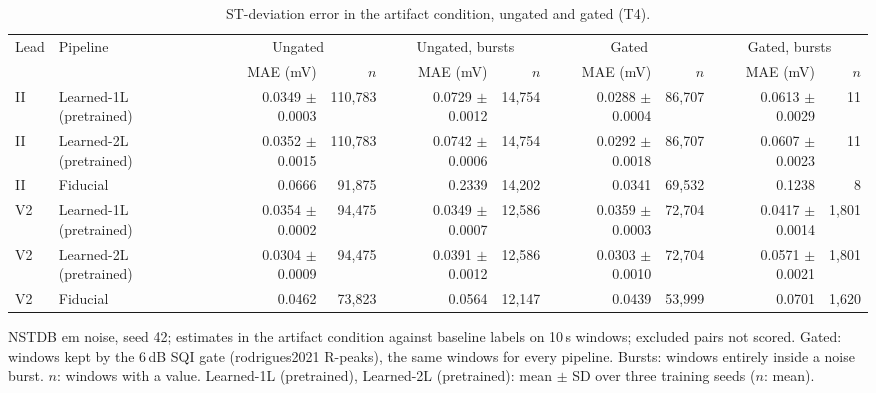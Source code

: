 \begin{table}[htbp]
\centering
\small
\caption{ST-deviation error in the artifact condition, ungated and gated (T4).}
\label{tab:t4_noise}
\begin{tabular}{llrrrrrrrr}
\toprule
Lead & Pipeline & \multicolumn{2}{c}{Ungated} & \multicolumn{2}{c}{Ungated, bursts} & \multicolumn{2}{c}{Gated} & \multicolumn{2}{c}{Gated, bursts} \\
 & & MAE (mV) & $n$ & MAE (mV) & $n$ & MAE (mV) & $n$ & MAE (mV) & $n$ \\
\midrule
II & Learned-1L (pretrained) & 0.0349 $\pm$ 0.0003 & 110{,}783 & 0.0729 $\pm$ 0.0012 & 14{,}754 & 0.0288 $\pm$ 0.0004 & 86{,}707 & 0.0613 $\pm$ 0.0029 & 11 \\
II & Learned-2L (pretrained) & 0.0352 $\pm$ 0.0015 & 110{,}783 & 0.0742 $\pm$ 0.0006 & 14{,}754 & 0.0292 $\pm$ 0.0018 & 86{,}707 & 0.0607 $\pm$ 0.0023 & 11 \\
II & Fiducial & 0.0666 & 91{,}875 & 0.2339 & 14{,}202 & 0.0341 & 69{,}532 & 0.1238 & 8 \\
\midrule
V2 & Learned-1L (pretrained) & 0.0354 $\pm$ 0.0002 & 94{,}475 & 0.0349 $\pm$ 0.0007 & 12{,}586 & 0.0359 $\pm$ 0.0003 & 72{,}704 & 0.0417 $\pm$ 0.0014 & 1{,}801 \\
V2 & Learned-2L (pretrained) & 0.0304 $\pm$ 0.0009 & 94{,}475 & 0.0391 $\pm$ 0.0012 & 12{,}586 & 0.0303 $\pm$ 0.0010 & 72{,}704 & 0.0571 $\pm$ 0.0021 & 1{,}801 \\
V2 & Fiducial & 0.0462 & 73{,}823 & 0.0564 & 12{,}147 & 0.0439 & 53{,}999 & 0.0701 & 1{,}620 \\
\bottomrule
\end{tabular}

\par\smallskip\footnotesize NSTDB em noise, seed 42; estimates in the artifact condition against baseline labels on 10\,s windows; excluded pairs not scored. Gated: windows kept by the 6\,dB SQI gate (rodrigues2021 R-peaks), the same windows for every pipeline. Bursts: windows entirely inside a noise burst. $n$: windows with a value. Learned-1L (pretrained), Learned-2L (pretrained): mean $\pm$ SD over three training seeds ($n$: mean).
\end{table}

